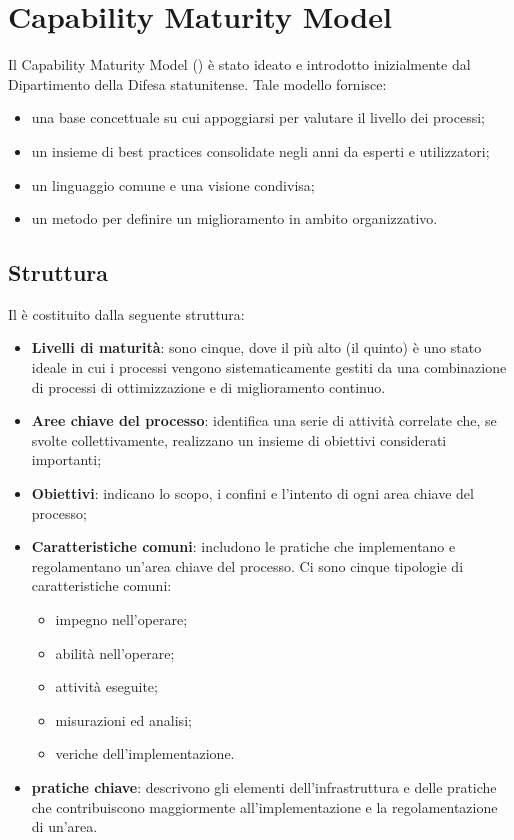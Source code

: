 \documentclass[PianoDiQualifica.tex]{subfiles}
\begin{document}
\hypertarget{CMM_label}{\section{Capability Maturity Model}}
	Il Capability Maturity Model () è stato ideato e introdotto inizialmente dal Dipartimento della Difesa statunitense. Tale modello
	fornisce:
	\begin{itemize}
		\item una base concettuale su cui appoggiarsi per valutare il livello dei processi;
		\item un insieme di best practices consolidate negli anni da esperti e utilizzatori;
		\item un linguaggio comune e una visione condivisa;
		\item un metodo per definire un miglioramento in ambito organizzativo.
	\end{itemize}
	\subsection{Struttura}
	Il  è costituito dalla seguente struttura:
	\begin{itemize}
		\item \textbf{Livelli di maturità}: sono cinque, dove il più alto (il quinto) è uno stato ideale in cui i processi vengono sistematicamente
		gestiti da una combinazione di processi di ottimizzazione e di miglioramento continuo. 
		\item \textbf{Aree chiave del processo}: identifica una serie di attività correlate che, se svolte collettivamente,
		realizzano un insieme di obiettivi considerati importanti;
		\item \textbf{Obiettivi}: indicano lo scopo, i confini e l'intento di ogni area chiave del processo;
		\item \textbf{Caratteristiche comuni}: includono le pratiche che implementano e regolamentano un'area chiave del processo. Ci sono cinque
		tipologie di caratteristiche comuni:
		\begin{itemize}
			\item impegno nell'operare;
			\item abilità nell'operare;
			\item attività eseguite;
			\item misurazioni ed analisi;
			\item veriche dell'implementazione.
		\end{itemize}
		\item \textbf{pratiche chiave}: descrivono gli elementi dell'infrastruttura e delle pratiche che contribuiscono maggiormente all'implementazione
		e la regolamentazione di un'area.
	\end{itemize}
	
\end{document}
